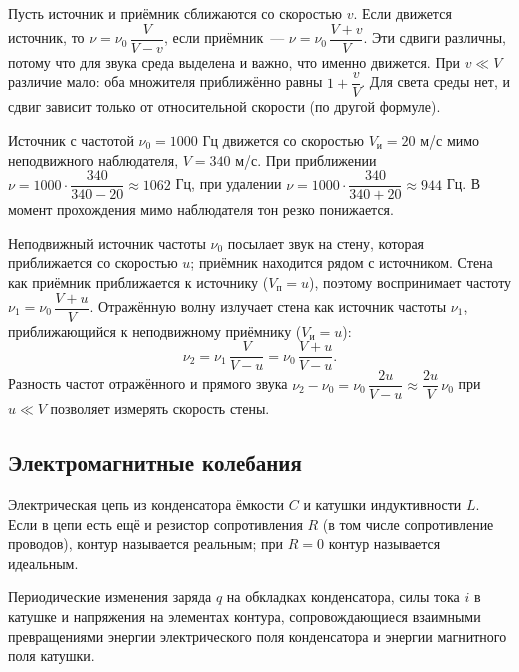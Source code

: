 \documentclass[12pt]{article}
\begin{document}
	\begin{note}
		Пусть источник и приёмник сближаются со скоростью $v$. Если движется источник, то $\nu = \nu_0\,\dfrac{V}{V - v}$, если приёмник~--- $\nu = \nu_0\,\dfrac{V + v}{V}$. Эти сдвиги различны, потому что для звука среда выделена и важно, что именно движется. При $v \ll V$ различие мало: оба множителя приближённо равны $1 + \dfrac{v}{V}$. Для света среды нет, и сдвиг зависит только от относительной скорости (по другой формуле).
	\end{note}

	\begin{example}[Сирена]
		Источник с частотой $\nu_0 = 1000$ Гц движется со скоростью $V_{\text{и}} = 20$ м/с мимо неподвижного наблюдателя, $V = 340$ м/с. При приближении $\nu = 1000 \cdot \dfrac{340}{340 - 20} \approx 1062$ Гц, при удалении $\nu = 1000 \cdot \dfrac{340}{340 + 20} \approx 944$ Гц. В момент прохождения мимо наблюдателя тон резко понижается.
	\end{example}

	\begin{example}
		Неподвижный источник частоты $\nu_0$ посылает звук на стену, которая приближается со скоростью $u$; приёмник находится рядом с источником. Стена как приёмник приближается к источнику ($V_{\text{п}} = u$), поэтому воспринимает частоту $\nu_1 = \nu_0\,\dfrac{V + u}{V}$. Отражённую волну излучает стена как источник частоты $\nu_1$, приближающийся к неподвижному приёмнику ($V_{\text{и}} = u$):
		\[
			\nu_2 = \nu_1\,\dfrac{V}{V - u} = \nu_0\,\dfrac{V + u}{V - u}.
		\]
		Разность частот отражённого и прямого звука $\nu_2 - \nu_0 = \nu_0\,\dfrac{2u}{V - u} \approx \dfrac{2u}{V}\,\nu_0$ при $u \ll V$ позволяет измерять скорость стены.
	\end{example}

	\subsection{Электромагнитные колебания}
	
	\begin{definition}
		Электрическая цепь из конденсатора ёмкости $C$ и катушки индуктивности $L$. Если в цепи есть ещё и резистор сопротивления $R$ (в том числе сопротивление проводов), контур называется реальным; при $R = 0$ контур называется идеальным.
	\end{definition}
	
	\begin{definition}
		Периодические изменения заряда $q$ на обкладках конденсатора, силы тока $i$ в катушке и напряжения на элементах контура, сопровождающиеся взаимными превращениями энергии электрического поля конденсатора и энергии магнитного поля катушки.
	\end{definition}
	
\end{document}

